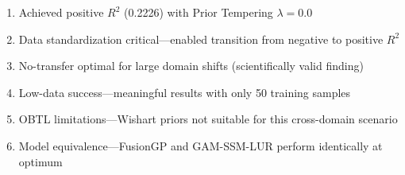 \begin{enumerate}
    \item Achieved positive \(R^2\) (0.2226) with Prior Tempering \(\lambda=0.0\)
    \item Data standardization critical---enabled transition from negative to positive \(R^2\)
    \item No-transfer optimal for large domain shifts (scientifically valid finding)
    \item Low-data success---meaningful results with only 50 training samples
    \item OBTL limitations---Wishart priors not suitable for this cross-domain scenario
    \item Model equivalence---FusionGP and GAM-SSM-LUR perform identically at optimum
\end{enumerate}
